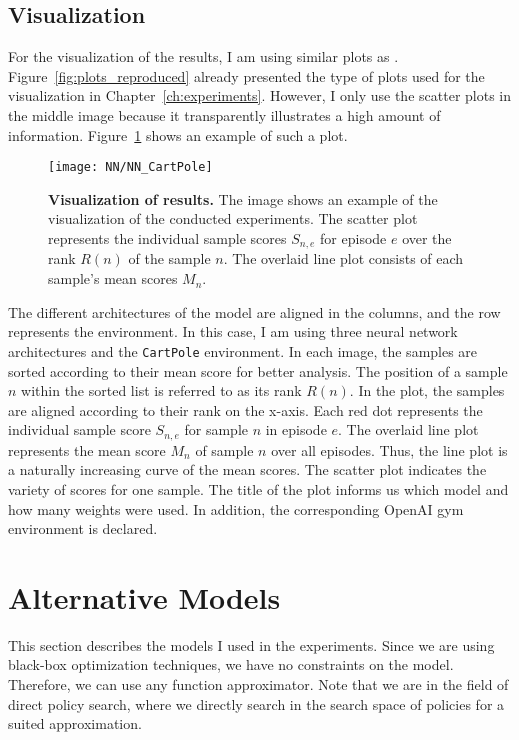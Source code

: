 \subsection{Visualization}
For the visualization of the results, I am using similar plots as \cite{oller_analyzing_2020}. Figure~\ref{fig:plots_reproduced} already presented the type of plots used for the visualization in Chapter~\ref{ch:experiments}. However, I only use the scatter plots in the middle image because it transparently illustrates a high amount of information. Figure~\ref{fig:visualization} shows an example of such a plot.
\begin{figure}[!ht]
  \centering
\texttt{[image: NN/NN\_CartPole]}
\caption[Visualization of results]{
  \textbf{Visualization of results.}
  The image shows an example of the visualization of the conducted experiments. The scatter plot represents the individual sample scores $S_{n,e}$ for episode $e$ over the rank $R(n)$ of the sample $n$. The overlaid line plot consists of each sample's mean scores $M_n$.
}
\label{fig:visualization}
\end{figure}
The different architectures of the model are aligned in the columns, and the row represents the environment. In this case, I am using three neural network architectures and the \verb|CartPole| environment. In each image, the samples are sorted according to their mean score for better analysis. The position of a sample $n$ within the sorted list is referred to as its rank $R(n)$. In the plot, the samples are aligned according to their rank on the x-axis. Each red dot represents the individual sample score $S_{n,e}$ for sample $n$ in episode $e$. The overlaid line plot represents the mean score $M_n$ of sample $n$ over all episodes. Thus, the line plot is a naturally increasing curve of the mean scores. The scatter plot indicates the variety of scores for one sample. The title of the plot informs us which model and how many weights were used. In addition, the corresponding OpenAI gym environment is declared.


\section{Alternative Models}
\label{sec:models}
This section describes the models I used in the experiments. Since we are using black-box optimization techniques, we have no constraints on the model. Therefore, we can use any function approximator. Note that we are in the field of direct policy search, where we directly search in the search space of policies for a suited approximation.

